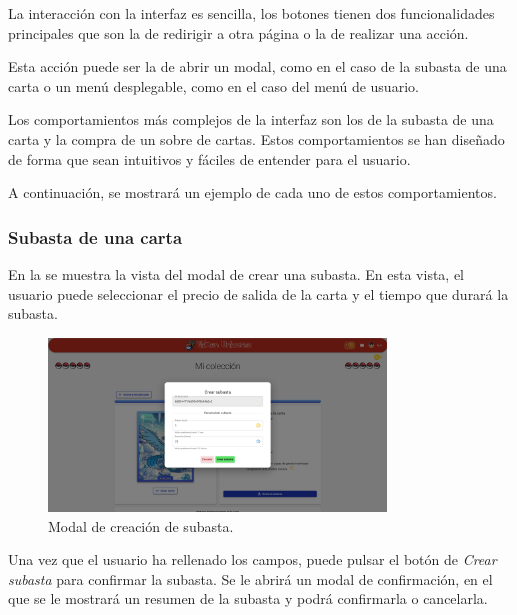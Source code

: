 La interacción con la interfaz es sencilla,
los botones tienen dos funcionalidades principales que son la de redirigir a otra página o la de realizar una acción.

Esta acción puede ser la de abrir un modal, como en el caso de la subasta de una carta o un menú desplegable, como en el caso del menú de usuario.

Los comportamientos más complejos de la interfaz son los de la subasta de una carta y la compra de un sobre de cartas.
Estos comportamientos se han diseñado de forma que sean intuitivos y fáciles de entender para el usuario.

A continuación, se mostrará un ejemplo de cada uno de estos comportamientos.

\subsubsection{Subasta de una carta}
En la  se muestra la vista del modal de crear una subasta.
En esta vista, el usuario puede seleccionar el precio de salida de la carta y el tiempo que durará la subasta.

\begin{figure}[H]
    \centering
    \includegraphics[width=0.8\textwidth]{figures/6-Analisis/6-Interfaz/interfaz/crear-subasta1.png}
    \caption{Modal de creación de subasta.}
    \hypertarget{fig:interfaz-subasta}{}
    \label{fig:interfaz-subasta}
\end{figure}

Una vez que el usuario ha rellenado los campos, puede pulsar el botón de \textit{Crear subasta} para confirmar la subasta.
Se le abrirá un modal de confirmación, en el que se le mostrará un resumen de la subasta y podrá confirmarla o cancelarla.

